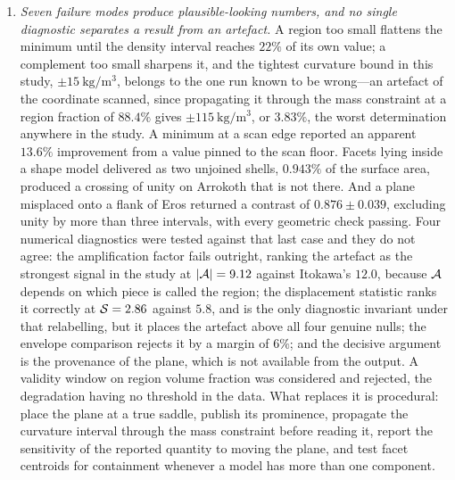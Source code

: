 \begin{enumerate}
\item \emph{Seven failure modes produce plausible-looking numbers, and no
single diagnostic separates a result from an artefact.} A region too small
flattens the minimum until the density interval reaches $22\%$ of its own
value; a complement too small sharpens it, and the tightest curvature
bound in this study, $\pm\SI{15}{\kilo\gram\per\cubic\metre}$, belongs to
the one run known to be wrong---an artefact of the coordinate scanned,
since propagating it through the mass constraint at a region fraction of
$88.4\%$ gives $\pm\SI{115}{\kilo\gram\per\cubic\metre}$, or $3.83\%$, the
worst determination anywhere in the study. A minimum at a scan edge
reported an apparent $13.6\%$ improvement from a value pinned to the scan
floor. Facets lying inside a shape model delivered as two unjoined shells,
$0.943\%$ of the surface area, produced a crossing of unity on Arrokoth
that is not there. And a plane misplaced onto a flank of Eros returned a
contrast of $0.876 \pm 0.039$, excluding unity by more than three
intervals, with every geometric check passing. Four numerical diagnostics
were tested against that last case and they do not agree: the
amplification factor fails outright, ranking the artefact as the strongest
signal in the study at $\lvert\mathcal{A}\rvert = 9.12$ against Itokawa's
$12.0$, because $\mathcal{A}$ depends on which piece is called the region; the
displacement statistic ranks it correctly at $\mathcal{S} = 2.86$ against
$5.8$, and is the only diagnostic invariant under that relabelling, but it
places the artefact above all four genuine nulls; the envelope comparison
rejects it by a margin of $6\%$; and the decisive argument is the
provenance of the plane, which is not available from the output. A
validity window on region volume fraction was considered and rejected, the
degradation having no threshold in the data. What replaces it is
procedural: place the plane at a true saddle, publish its prominence,
propagate the curvature interval through the mass constraint before
reading it, report the sensitivity of the reported quantity to moving the
plane, and test facet centroids for containment whenever a model has more
than one component.


\end{enumerate}
